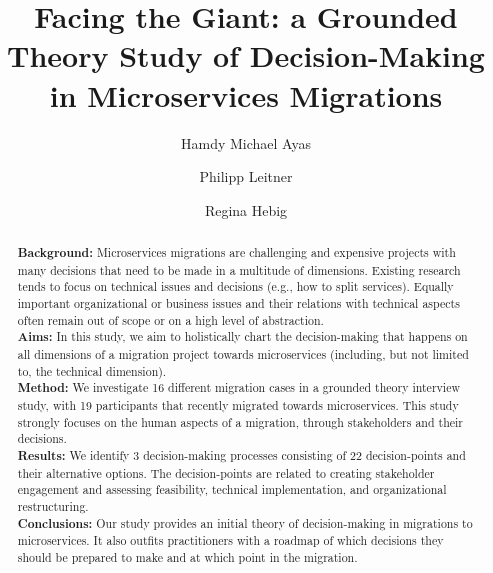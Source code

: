 \documentclass[sigconf,dvipsnames]{acmart}
\begin{document}
\title{Facing the Giant: a Grounded Theory Study of Decision-Making in Microservices Migrations}

\author{Hamdy Michael Ayas}
\author{Philipp Leitner}
\author{Regina Hebig}



\renewcommand{\shortauthors}{Michael Ayas, et al.}

\begin{abstract}
\textbf{Background:} Microservices migrations are challenging and expensive projects with many decisions that need to be made in a multitude of dimensions. 
Existing research tends to focus on technical issues and decisions (e.g., how to split services). Equally important organizational or business issues and their relations with technical aspects often remain out of scope or on a high level of abstraction. \\
\textbf{Aims:} In this study, we aim to holistically chart the decision-making that happens on all dimensions of a migration project towards microservices (including, but not limited to, the technical dimension). \\ 
\textbf{Method:} We investigate 16 different migration cases in a grounded theory interview study, with 19 participants that recently migrated towards microservices. 
This study strongly focuses on the human aspects of a migration, through stakeholders and their decisions. \\
\textbf{Results:} We identify 3 decision-making processes consisting of 22 decision-points and their alternative options. The decision-points are related to creating stakeholder engagement and assessing feasibility, technical implementation, and organizational restructuring. \\
\textbf{Conclusions:} Our study provides an initial theory of decision-making in migrations to microservices. It also outfits practitioners with a roadmap of which decisions they should be prepared to make and at which point in the migration.
\end{abstract}
\end{document}
